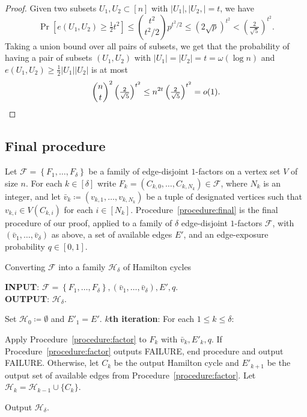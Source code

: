 \documentclass{article}
\begin{document}
	\begin{proof}
		Given two subsets $U_1, U_2 \subset [n]$ with $|U_1|, |U_2,| = t$, we have
		\[\Pr\left[e(U_1, U_2) \ge \tfrac{1}{2}t^2 \right] \le \binom{t^2}{t^2/2}p^{t^2/2} \le (2\sqrt{p})^{t^2} < \left(\tfrac{2}{\sqrt{5}} \right)^{t^2}. \]
		Taking a union bound over all pairs of subsets, we get that the probability of having a pair of subsets $(U_1, U_2)$ with $|U_1|=|U_2|=t = \omega(\log n)$ and $e(U_1, U_2) \ge \frac{1}{2}|U_1||U_2|$ is at most
		\[\binom{n}{t}^2 \left(\tfrac{2}{\sqrt{5}} \right)^{t^2} \le n^{2t} \left(\tfrac{2}{\sqrt{5}} \right)^{t^2} = o(1). \qedhere \]
	\end{proof}
	
	
	\subsection{Final procedure}
	
	Let $\mathcal F = \left\{F_1, \ldots, F_{\delta} \right\}$ be a family of edge-disjoint $1$-factors on a vertex set $V$ of size $n$.
	For each $k \in [\delta]$ write $F_k = (C_{k,0}, \ldots, C_{k,N_k}) \in \mathcal F$, where $N_k$ is an integer, and let $\bar{v}_k\coloneqq \left(v_{k,1}, \ldots, v_{k,N_k} \right)$ be a tuple of designated vertices 
	such that $v_{k,i} \in V(C_{k,i})$ for each $i \in [N_k]$.
	Procedure~\ref{procedure:final} is the final procedure of our proof, applied to a family of $\delta$ edge-disjoint $1$-factors $\mathcal F$, with $\left(\bar{v}_1, \ldots, \bar{v}_{\delta} \right)$ as above, a set of available edges $E'$, and an edge-exposure probability $q \in [0,1]$.
	\begin{algorithm}
		\caption{Converting $\mathcal F$ into a family $\mathcal H_{\delta}$ of Hamilton cycles}
		\label{procedure:final}
		\textbf{INPUT}: $\mathcal F = \left\{F_1, \ldots, F_{\delta} \right\}, \left(\bar{v}_1, \ldots, \bar{v}_{\delta} \right), E', q$. \\
		\textbf{OUTPUT}: $\mathcal H_{\delta}$.
		\begin{algorithmic}[1]
			\STATE Set $\mathcal H_0 \coloneqq \emptyset$ and $E'_1 = E'$.
			\STATE \textbf{$k$th iteration}: For each $1\le k \le \delta$:
			\begin{ALC@g}
				\STATE Apply Procedure~\ref{procedure:factor} to $F_k$ with $\bar{v}_k, E'_k, q$.
				\STATE If Procedure~\ref{procedure:factor} outputs FAILURE, end procedure and output FAILURE.
				Otherwise, let $C_k$ be the output Hamilton cycle and $E'_{k+1}$ be the output set of available edges from Procedure~\ref{procedure:factor}.
				Let $\mathcal H_k = \mathcal H_{k-1} \cup \{C_k \}$.
			\end{ALC@g}
			\STATE Output $\mathcal H_{\delta}$.
		\end{algorithmic}
	\end{algorithm}
	
\end{document}

